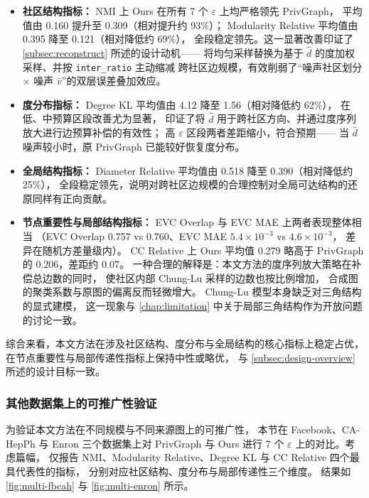 \begin{itemize}
    \item \textbf{社区结构指标：}
    NMI 上 Ours 在所有 7 个 $\varepsilon$ 上均严格领先 PrivGraph，
    平均值由 0.160 提升至 0.309（相对提升约 93\%）；
    Modularity Relative 平均值由 0.395 降至 0.121（相对降低约 69\%），
    全段稳定领先。这一显著改善印证了 \autoref{subsec:reconstruct} 所述的设计动机——
    将均匀采样替换为基于 $\hat{d}$ 的度加权采样、并按 \texttt{inter\_ratio} 主动缩减
    跨社区边规模，有效削弱了``噪声社区划分 $\times$ 噪声 $\hat{v}$''的双层误差叠加效应。

    \item \textbf{度分布指标：}
    Degree KL 平均值由 4.12 降至 1.56（相对降低约 62\%），
    在低、中预算区段改善尤为显著，
    印证了将 $\hat{d}$ 用于跨社区方向、并通过度序列放大进行边预算补偿的有效性；
    高 $\varepsilon$ 区段两者差距缩小，符合预期——
    当 $\hat{d}$ 噪声较小时，原 PrivGraph 已能较好恢复度分布。

    \item \textbf{全局结构指标：}
    Diameter Relative 平均值由 0.518 降至 0.390（相对降低约 25\%），
    全段稳定领先，说明对跨社区边规模的合理控制对全局可达结构的还原同样有正向贡献。

    \item \textbf{节点重要性与局部结构指标：}
    EVC Overlap 与 EVC MAE 上两者表现整体相当
    （EVC Overlap 0.757 vs 0.760、EVC MAE $5.4 \times 10^{-3}$ vs $4.6 \times 10^{-3}$，
    差异在随机方差量级内）。
    CC Relative 上 Ours 平均值 0.279 略高于 PrivGraph 的 0.206，差距约 0.07。
    一种合理的解释是：本文方法的度序列放大策略在补偿总边数的同时，
    使社区内部 Chung-Lu 采样的边数也按比例增加，
    合成图的聚类系数与原图的偏离反而轻微增大。
    Chung-Lu 模型本身缺乏对三角结构的显式建模，
    这一现象与 \autoref{chap:limitation} 中关于局部三角结构作为开放问题的讨论一致。
\end{itemize}

\par 综合来看，本文方法在涉及社区结构、度分布与全局结构的核心指标上稳定占优，
在节点重要性与局部传递性指标上保持中性或略优，
与 \autoref{subsec:design-overview} 所述的设计目标一致。


\subsubsection{其他数据集上的可推广性验证}
\label{subsec:exp-main-other}

\par 为验证本文方法在不同规模与不同来源图上的可推广性，
本节在 Facebook、CA-HepPh 与 Enron 三个数据集上对 PrivGraph 与 Ours
进行 7 个 $\varepsilon$ 上的对比。考虑篇幅，
仅报告 NMI、Modularity Relative、Degree KL 与 CC Relative 四个最具代表性的指标，
分别对应社区结构、度分布与局部传递性三个维度。
结果如 \autoref{fig:multi-fbcah} 与 \autoref{fig:multi-enron} 所示。

